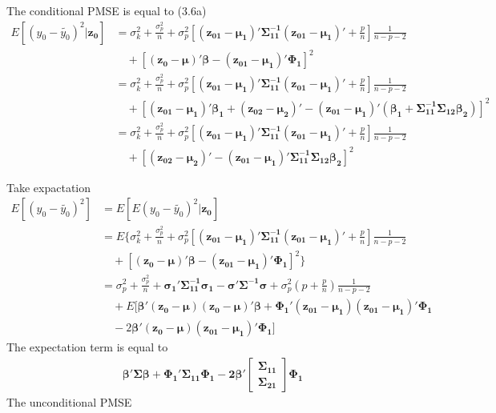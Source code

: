 \documentclass[11pt]{article}
\begin{document}
The conditional PMSE is equal to (3.6a)
$$\begin{aligned}
E[(y_0-\tilde{y_0})^2|\boldsymbol{z_0}] &= \sigma_k^2+\frac{\sigma_p^2}{n}+\sigma_p^2\left[\boldsymbol{(z_{01}-\mu_1)'\Sigma_{11}^{-1}(z_{01}-\mu_1)'}+\frac{p}{n}\right]\frac{1}{n-p-2}\\
&\quad+[\boldsymbol{(z_0-\mu)'\beta-(z_{01}-\mu_1)'\Phi_1}]^2\\
&=\sigma_k^2+\frac{\sigma_p^2}{n}+\sigma_p^2\left[\boldsymbol{(z_{01}-\mu_1)'\Sigma_{11}^{-1}(z_{01}-\mu_1)'}+\frac{p}{n}\right]\frac{1}{n-p-2}\\
&\quad+[\boldsymbol{(z_{01}-\mu_1)'\beta_1+(z_{02}-\mu_2)'-(z_{01}-\mu_1)'(\beta_1+\Sigma_{11}^{-1}\Sigma_{12}\beta_2)}]^2\\
&=\sigma_k^2+\frac{\sigma_p^2}{n}+\sigma_p^2\left[\boldsymbol{(z_{01}-\mu_1)'\Sigma_{11}^{-1}(z_{01}-\mu_1)'}+\frac{p}{n}\right]\frac{1}{n-p-2}\\
&\quad+[\boldsymbol{(z_{02}-\mu_2)'-(z_{01}-\mu_1)'\Sigma_{11}^{-1}\Sigma_{12}\beta_2}]^2
\end{aligned}$$


Take expactation
$$\begin{aligned}
E[(y_0-\tilde{y_0})^2]
&=E[E(y_0-\tilde{y_0})^2|\boldsymbol{z_0}]\\
&=E\{\sigma_k^2+\frac{\sigma_p^2}{n}+\sigma_p^2\left[\boldsymbol{(z_{01}-\mu_1)'\Sigma_{11}^{-1}(z_{01}-\mu_1)'}+\frac{p}{n}\right]\frac{1}{n-p-2}\\
&\quad+[\boldsymbol{(z_0-\mu)'\beta-(z_{01}-\mu_1)'\Phi_1}]^2\}\\
&=\sigma_p^2+\frac{\sigma_p^2}{n}+\boldsymbol{\sigma_1'\Sigma_{11}^{-1}\sigma_1-\sigma'\Sigma^{-1}\sigma}+\sigma_p^2\left(p+\frac{p}{n}\right)\frac{1}{n-p-2}\\
&\quad+E[\boldsymbol{\beta'(z_0-\mu)(z_0-\mu)'\beta+\Phi_1'(z_{01}-\mu_1)(z_{01}-\mu_1)'\Phi_1}\\
&\quad-2\boldsymbol{\beta'(z_0-\mu)(z_{01}-\mu_1)'\Phi_1}]
\end{aligned}$$
The expectation term is equal to
$$\begin{aligned}
&\boldsymbol{\beta'\Sigma\beta+\Phi_1'\Sigma_{11}\Phi_1-2\beta'}
\begin{bmatrix}\boldsymbol{\Sigma_{11}}\\
\boldsymbol{\Sigma_{21}}\end{bmatrix}\boldsymbol{\Phi_1}
\end{aligned}$$
The unconditional PMSE 
\end{document}
